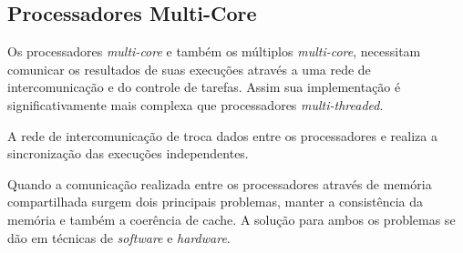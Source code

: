 \subsection{Processadores Multi-Core}

Os processadores \textit{multi-core} e também os múltiplos
\textit{multi-core}, necessitam comunicar os resultados de suas execuções
através a uma rede de intercomunicação e do controle de tarefas.
Assim sua implementação é significativamente mais complexa que processadores
\textit{multi-threaded}.

A rede de intercomunicação de troca dados entre os processadores e realiza a
sincronização das execuções independentes.

Quando a comunicação realizada entre os processadores através de memória
compartilhada surgem dois principais problemas, manter a consistência da memória
e também a coerência de cache.
A solução para ambos os problemas se dão em técnicas de \textit{software} e
\textit{hardware}.
